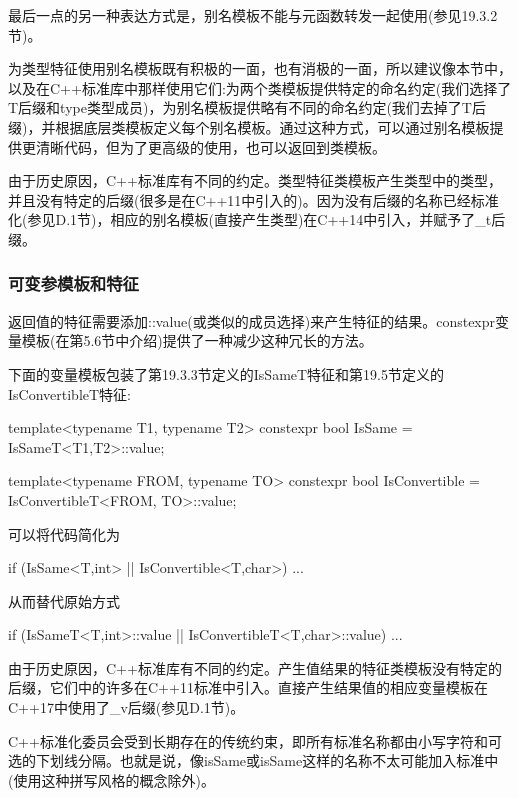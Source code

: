 最后一点的另一种表达方式是，别名模板不能与元函数转发一起使用(参见19.3.2节)。

为类型特征使用别名模板既有积极的一面，也有消极的一面，所以建议像本节中，以及在C++标准库中那样使用它们:为两个类模板提供特定的命名约定(我们选择了T后缀和type类型成员)，为别名模板提供略有不同的命名约定(我们去掉了T后缀)，并根据底层类模板定义每个别名模板。通过这种方式，可以通过别名模板提供更清晰代码，但为了更高级的使用，也可以返回到类模板。

由于历史原因，C++标准库有不同的约定。类型特征类模板产生类型中的类型，并且没有特定的后缀(很多是在C++11中引入的)。因为没有后缀的名称已经标准化(参见D.1节)，相应的别名模板(直接产生类型)在C++14中引入，并赋予了\_t后缀。

\subsubsection{可变参模板和特征}

返回值的特征需要添加::value(或类似的成员选择)来产生特征的结果。constexpr变量模板(在第5.6节中介绍)提供了一种减少这种冗长的方法。

下面的变量模板包装了第19.3.3节定义的IsSameT特征和第19.5节定义的IsConvertibleT特征:

\begin{cpp}
template<typename T1, typename T2>
	constexpr bool IsSame = IsSameT<T1,T2>::value;
	
template<typename FROM, typename TO>
	constexpr bool IsConvertible = IsConvertibleT<FROM, TO>::value;
\end{cpp}

可以将代码简化为

\begin{cpp}
if (IsSame<T,int> || IsConvertible<T,char>) ...
\end{cpp}

从而替代原始方式

\begin{cpp}
if (IsSameT<T,int>::value || IsConvertibleT<T,char>::value) ...
\end{cpp}

由于历史原因，C++标准库有不同的约定。产生值结果的特征类模板没有特定的后缀，它们中的许多在C++11标准中引入。直接产生结果值的相应变量模板在C++17中使用了\_v后缀(参见D.1节)。

\begin{notice}
C++标准化委员会受到长期存在的传统约束，即所有标准名称都由小写字符和可选的下划线分隔。也就是说，像isSame或isSame这样的名称不太可能加入标准中(使用这种拼写风格的概念除外)。
\end{notice}




